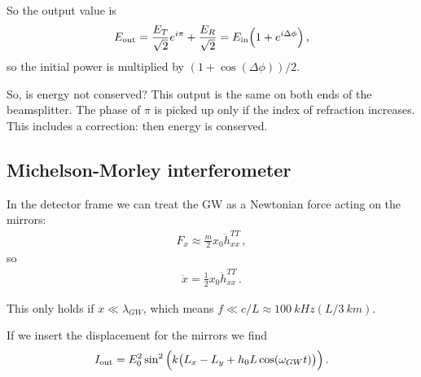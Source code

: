 \documentclass[main.tex]{subfiles}
\begin{document}
So the output value is 
%
\begin{align}
E _{\text{out}} = \frac{E_{T}}{\sqrt{2}} e^{i \pi }
+ \frac{E_{R}}{\sqrt{2}} = E _{\text{in}} \qty(1 + e^{i \Delta \phi })
\,,
\end{align}
%
so the initial power is multiplied by \((1 + \cos( \Delta \phi )) / 2 \). 

So, is energy not conserved? This output is the same on both ends of the beamsplitter. The phase of \(\pi \) is picked up only if the index of refraction increases. This includes a correction: then energy is conserved.

\subsection{Michelson-Morley interferometer}

In the detector frame we can treat the GW as a Newtonian force acting on the mirrors: 
%
\begin{align}
F_{x} \approx \frac{m}{2} x_0 \ddot{h}_{xx}^{TT} 
\,,
\end{align}
%
so 
%
\begin{align}
\ddot{x} = \frac{1}{2} x_0 \ddot{h}^{TT}_{xx}
\,.
\end{align}

This only holds if \(x \ll \lambda_{GW}\), which means \(f \ll c/ L  \approx \SI{100}{kHz} (L / \SI{3}{km} )\).

If we insert the displacement for the mirrors we find 
%
\begin{align}
I _{\text{out}} = E_0^2 \sin^2 \qty(k \qty(L_x - L_y + h_0 L \cos(\omega_{GW} t)))
\,.
\end{align}
%
\end{document}
